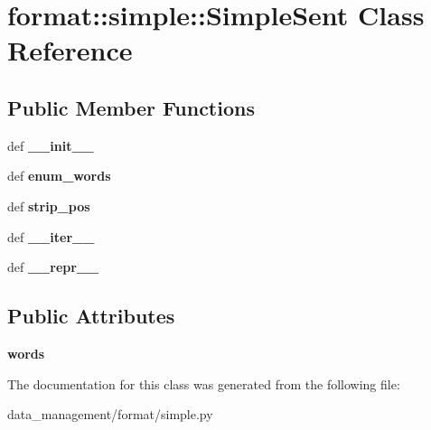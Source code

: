 \hypertarget{classformat_1_1simple_1_1SimpleSent}{
\section{format::simple::SimpleSent Class Reference}
\label{classformat_1_1simple_1_1SimpleSent}
}
\subsection*{Public Member Functions}
\begin{DoxyCompactItemize}
\item 
\hypertarget{classformat_1_1simple_1_1SimpleSent_ae1ae05e6abaf44cc556c923da5699ae6}{
def {\bfseries \_\-\_\-init\_\-\_\-}}
\label{classformat_1_1simple_1_1SimpleSent_ae1ae05e6abaf44cc556c923da5699ae6}

\item 
\hypertarget{classformat_1_1simple_1_1SimpleSent_a0ae8d170a77b69c42a6124fe648ab6d7}{
def {\bfseries enum\_\-words}}
\label{classformat_1_1simple_1_1SimpleSent_a0ae8d170a77b69c42a6124fe648ab6d7}

\item 
\hypertarget{classformat_1_1simple_1_1SimpleSent_a37c8c21b77c9e2c10f768271fea57458}{
def {\bfseries strip\_\-pos}}
\label{classformat_1_1simple_1_1SimpleSent_a37c8c21b77c9e2c10f768271fea57458}

\item 
\hypertarget{classformat_1_1simple_1_1SimpleSent_ac028e29fbffbe4b8e41ed85272c05f13}{
def {\bfseries \_\-\_\-iter\_\-\_\-}}
\label{classformat_1_1simple_1_1SimpleSent_ac028e29fbffbe4b8e41ed85272c05f13}

\item 
\hypertarget{classformat_1_1simple_1_1SimpleSent_a030a8fdd326a759a9de9c8ca39cc4396}{
def {\bfseries \_\-\_\-repr\_\-\_\-}}
\label{classformat_1_1simple_1_1SimpleSent_a030a8fdd326a759a9de9c8ca39cc4396}

\end{DoxyCompactItemize}
\subsection*{Public Attributes}
\begin{DoxyCompactItemize}
\item 
\hypertarget{classformat_1_1simple_1_1SimpleSent_a5a89ed7fd128d563585eabc801396623}{
{\bfseries words}}
\label{classformat_1_1simple_1_1SimpleSent_a5a89ed7fd128d563585eabc801396623}

\end{DoxyCompactItemize}


The documentation for this class was generated from the following file:\begin{DoxyCompactItemize}
\item 
data\_\-management/format/simple.py\end{DoxyCompactItemize}
